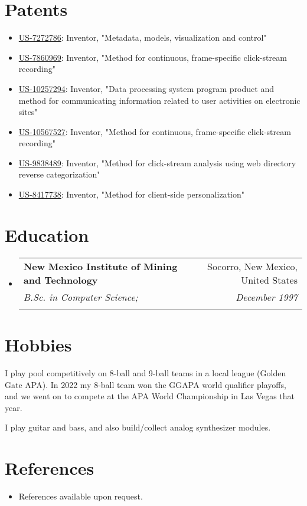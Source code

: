 \documentclass[letterpaper,11pt]{article}
\makeatletter
\newcommand{\resumeItem}[1]{
  \item\small{
    {#1 \vspace{-2pt}}
  }
}
\newcommand{\resumeEducationHeading}[6]{
  \vspace{-2pt}\item
    \begin{tabular*}{0.97\textwidth}[t]{l@{\extracolsep{\fill}}r}
      \textbf{#1} & #2 \\
      \textit{\small#3} & \textit{\small #4} \\
      \textit{\small#5} & \textit{\small #6} \\
    \end{tabular*}\vspace{-5pt}
}
\newcommand{\resumeSubHeadingListStart}{\begin{itemize}[leftmargin=0.15in, label={}]}
\newcommand{\resumeSubHeadingListEnd}{\end{itemize}}
\makeatother
\begin{document}
\section{Patents}
  \vspace{3pt}
  \resumeSubHeadingListStart
    \resumeItem{\href{https://ppubs.uspto.gov/dirsearch-public/print/downloadPdf/7272786}{US-7272786}: Inventor, "Metadata, models, visualization and control"}
    \resumeItem{\href{https://ppubs.uspto.gov/dirsearch-public/print/downloadPdf/7860969}{US-7860969}: Inventor, "Method for continuous, frame-specific click-stream recording"}
    \resumeItem{\href{https://ppubs.uspto.gov/dirsearch-public/print/downloadPdf/10257294}{US-10257294}: Inventor, "Data processing system program product and method for communicating information related to user activities on electronic sites"}
    \resumeItem{\href{https://ppubs.uspto.gov/dirsearch-public/print/downloadPdf/10567527}{US-10567527}: Inventor, "Method for continuous, frame-specific click-stream recording"}
    \resumeItem{\href{https://ppubs.uspto.gov/dirsearch-public/print/downloadPdf/9838489}{US-9838489}: Inventor, "Method for click-stream analysis using web directory reverse categorization"}
    \resumeItem{\href{https://ppubs.uspto.gov/dirsearch-public/print/downloadPdf/8417738}{US-8417738}: Inventor, "Method for client-side personalization"}
  \resumeSubHeadingListEnd


\section{Education}
  \vspace{3pt}
  \resumeSubHeadingListStart
    
    \resumeEducationHeading
      {New Mexico Institute of Mining and Technology}{Socorro, New Mexico, United States}
      {B.Sc. in Computer Science;}{December 1997}
      {}
      {}
    
  \resumeSubHeadingListEnd



\section{Hobbies}
  \resumeSubHeadingListStart
    \small{\item{I play pool competitively on 8-ball and 9-ball teams in a local league (Golden Gate APA). In 2022 my 8-ball team won the GGAPA world qualifier playoffs, and we went on to compete at the APA World Championship in Las Vegas that year.}}
    \small{\item{I play guitar and bass, and also build/collect analog synthesizer modules.}}
  \resumeSubHeadingListEnd




\section{References}
  \vspace{2pt}
  \resumeSubHeadingListStart
    \item{References available upon request.}
  \resumeSubHeadingListEnd


\end{document}
